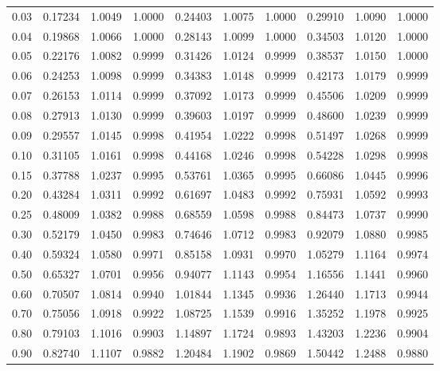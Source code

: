{\begin{longtable}{|||j{3.2}|X|X|X|||}
0.03   & 0.17234  & 1.0049  & 1.0000  & 0.24403   & 1.0075  & 1.0000  & 0.29910  & 1.0090  & 1.0000 \\ 
0.04   & 0.19868  & 1.0066  & 1.0000  & 0.28143   & 1.0099  & 1.0000  & 0.34503  & 1.0120  & 1.0000 \\  
0.05   & 0.22176  & 1.0082  & 0.9999  & 0.31426   & 1.0124  & 0.9999  & 0.38537  & 1.0150  & 1.0000 \\  
0.06   & 0.24253  & 1.0098  & 0.9999  & 0.34383   & 1.0148  & 0.9999  & 0.42173  & 1.0179  & 0.9999 \\   
0.07   & 0.26153  & 1.0114  & 0.9999  & 0.37092   & 1.0173  & 0.9999  & 0.45506  & 1.0209  & 0.9999 \\  
0.08   & 0.27913  & 1.0130  & 0.9999  & 0.39603   & 1.0197  & 0.9999  & 0.48600  & 1.0239  & 0.9999 \\  
0.09   & 0.29557  & 1.0145  & 0.9998  & 0.41954   & 1.0222  & 0.9998  & 0.51497  & 1.0268  & 0.9999 \\  
0.10   & 0.31105  & 1.0161  & 0.9998  & 0.44168   & 1.0246  & 0.9998  & 0.54228  & 1.0298  & 0.9998 \\[6pt]   
%
0.15   & 0.37788  & 1.0237  & 0.9995  & 0.53761   & 1.0365  & 0.9995  & 0.66086  & 1.0445  & 0.9996 \\*  
0.20   & 0.43284  & 1.0311  & 0.9992  & 0.61697   & 1.0483  & 0.9992  & 0.75931  & 1.0592  & 0.9993 \\  
0.25   & 0.48009  & 1.0382  & 0.9988  & 0.68559   & 1.0598  & 0.9988  & 0.84473  & 1.0737  & 0.9990 \\  
0.30   & 0.52179  & 1.0450  & 0.9983  & 0.74646   & 1.0712  & 0.9983  & 0.92079  & 1.0880  & 0.9985 \\  
0.40   & 0.59324  & 1.0580  & 0.9971  & 0.85158   & 1.0931  & 0.9970  & 1.05279  & 1.1164  & 0.9974 \\  
0.50   & 0.65327  & 1.0701  & 0.9956  & 0.94077   & 1.1143  & 0.9954  & 1.16556  & 1.1441  & 0.9960 \\ 
0.60   & 0.70507  & 1.0814  & 0.9940  & 1.01844   & 1.1345  & 0.9936  & 1.26440  & 1.1713  & 0.9944 \\  
0.70   & 0.75056  & 1.0918  & 0.9922  & 1.08725   & 1.1539  & 0.9916  & 1.35252  & 1.1978  & 0.9925 \\  
0.80   & 0.79103  & 1.1016  & 0.9903  & 1.14897   & 1.1724  & 0.9893  & 1.43203  & 1.2236  & 0.9904 \\  
0.90   & 0.82740  & 1.1107  & 0.9882  & 1.20484   & 1.1902  & 0.9869  & 1.50442  & 1.2488  & 0.9880 \\[6pt]  

\end{longtable}}
